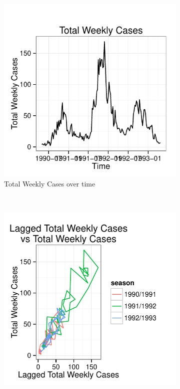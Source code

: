 \documentclass[fleqn]{article}\usepackage[]{graphicx}\usepackage[]{color}
\makeatletter
\def\maxwidth{ %
  \ifdim\Gin@nat@width>\linewidth
    \linewidth
  \else
    \Gin@nat@width
  \fi
}
\newenvironment{knitrout}{}{} %
\makeatother
\begin{document}
\begin{figure}[t!]
\centering
\begin{subfigure}[t]{0.475\textwidth}
\begin{knitrout}
\color{fgcolor}
\includegraphics[width=\maxwidth]{figure/SJPRWeeklyCaseCounts-1} 

\end{knitrout}
\caption{Total Weekly Cases over time}
\end{subfigure}
~
\begin{subfigure}[t]{0.475\textwidth}
\begin{knitrout}
\color{fgcolor}
\includegraphics[width=\maxwidth]{figure/SJPRWeeklyCaseCounts2-1} 


\end{knitrout}
\end{subfigure}
\end{figure}
\end{document}
